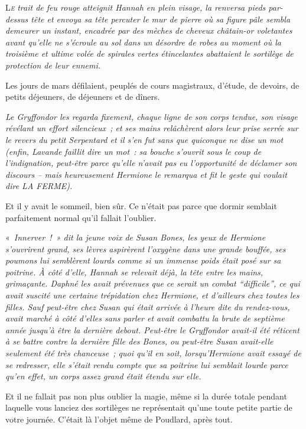 
\lettrine{L}{\emph{e}} \emph{trait de feu rouge atteignit Hannah en plein visage, la renversa pieds par-dessus tête et envoya sa tête percuter le mur de pierre où sa figure pâle sembla demeurer un instant, encadrée par des mèches de cheveux châtain-or voletantes avant qu'elle ne s'écroule au sol dans un désordre de robes au moment où la troisième et ultime volée de spirales vertes étincelantes abattaient le sortilège de protection de leur ennemi.}

Les jours de mars défilaient, peuplés de cours magistraux, d'étude, de devoirs, de petits déjeuners, de déjeuners et de dîners.

\emph{Le Gryffondor les regarda fixement, chaque ligne de son corps tendue, son visage révélant un effort silencieux~; et ses mains relâchèrent alors leur prise serrée sur le revers du petit Serpentard et il s'en fut sans que quiconque ne dise un mot (enfin, Lavande faillit dire un mot~: sa bouche s'ouvrit sous le coup de l'indignation, peut-être parce qu'elle n'avait pas eu l'opportunité de déclamer son discours -- mais heureusement Hermione le remarqua et fit le geste qui voulait dire LA FERME).}

Et il y avait le sommeil, bien sûr.
Ce n'était pas parce que dormir semblait parfaitement normal qu'il fallait l'oublier.

«~\emph{Innerver~!~»
dit la jeune voix de Susan Bones, les yeux de Hermione s'ouvrirent grand, ses lèvres aspirèrent l'oxygène dans une grande bouffée, ses poumons lui semblèrent lourds comme si un immense poids était posé sur sa poitrine.
À côté d'elle, Hannah se relevait déjà, la tête entre les mains, grimaçante.
Daphné les avait prévenues que ce serait un combat “difficile”, ce qui avait suscité une certaine trépidation chez Hermione, et d'ailleurs chez toutes les filles.
Sauf peut-être chez Susan qui était arrivée à l'heure dite du rendez-vous, avait marché à côté d'elles sans parler et avait combattu la brute de septième année jusqu'à être la dernière debout.
Peut-être le Gryffondor avait-il été réticent à se battre contre la dernière fille des Bones, ou peut-être Susan avait-elle seulement été très chanceuse~; quoi qu'il en soit, lorsqu'Hermione avait essayé de se redresser, elle s'était rendu compte que sa poitrine lui semblait lourde parce qu'en effet, un corps assez grand était étendu sur elle.}

Et il ne fallait pas non plus oublier la magie, même si la durée totale pendant laquelle vous lanciez des sortilèges ne représentait qu'une toute petite partie de votre journée.
C'était là l'objet même de Poudlard, après tout.

